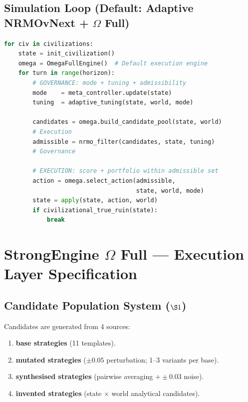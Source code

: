 \subsection{Simulation Loop (Default: Adaptive NRMOvNext +
$\Omega$ Full)}
\label{sec:omega-civ-loop}

\begin{lstlisting}[language=Python,basicstyle=\ttfamily\scriptsize,frame=single]
for civ in civilizations:
    state = init_civilization()
    omega = OmegaFullEngine()  # Default execution engine
    for turn in range(horizon):
        # GOVERNANCE: mode + tuning + admissibility
        mode    = meta_controller.update(state)
        tuning  = adaptive_tuning(state, world, mode)

        candidates = omega.build_candidate_pool(state, world)
        # Execution
        admissible = nrmo_filter(candidates, state, tuning)
        # Governance

        # EXECUTION: score + portfolio within admissible set
        action = omega.select_action(admissible,
                                     state, world, mode)
        state = apply(state, action, world)
        if civilizational_true_ruin(state):
            break
\end{lstlisting}

\section{StrongEngine $\Omega$ Full --- Execution Layer
Specification}
\label{sec:omega-full-spec}


\subsection{Candidate Population System ($\S 1$)}
\label{sec:omega-candidate-pop}

Candidates are generated from 4 sources:

\begin{enumerate}
\item \textbf{base strategies} (11 templates).
\item \textbf{mutated strategies} ($\pm 0.05$ perturbation; 1--3
variants per base).
\item \textbf{synthesised strategies} (pairwise averaging $+
\pm 0.03$ noise).
\item \textbf{invented strategies}
(state $\times$ world analytical candidates).
\end{enumerate}

